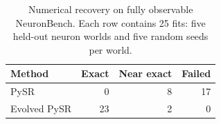 
\begin{table}[t]
  \caption{Numerical recovery on fully observable NeuronBench. Each row contains
  25 fits: five held-out neuron worlds and five random seeds per world.}
  \label{tab:neuronbench-recovery}
  \centering
  \small
  \setlength{\tabcolsep}{4pt}
  \begin{tabularx}{\linewidth}{@{}Xrrr@{}}
    \toprule
    Method & Exact & Near exact & Failed \\
    \midrule
    PySR & 0 & 8 & 17  \\
    Evolved PySR & 23  & 2  & 0 \\
    \bottomrule
  \end{tabularx}
  \vspace{2pt}

\end{table}
